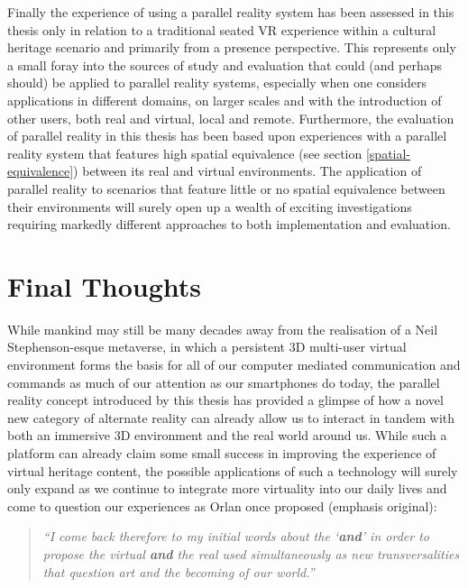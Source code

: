 Finally the experience of using a parallel reality system has been assessed in this thesis only in relation to a traditional seated VR experience within a cultural heritage scenario and primarily from a presence perspective. This represents only a small foray into the sources of study and evaluation that could (and perhaps should) be applied to parallel reality systems, especially when one considers applications in different domains, on larger scales and with the introduction of other users, both real and virtual, local and remote. Furthermore, the evaluation of parallel reality in this thesis has been based upon experiences with a parallel reality system that features high spatial equivalence (see section \ref{spatial-equivalence}) between its real and virtual environments. The application of parallel reality to scenarios that feature little or no spatial equivalence between their environments will surely open up a wealth of exciting investigations requiring markedly different approaches to both implementation and evaluation.


\section{Final Thoughts}

While mankind may still be many decades away from the realisation of a Neil Stephenson-esque metaverse, in which a persistent 3D multi-user virtual environment forms the basis for all of our computer mediated communication and commands as much of our attention as our smartphones do today, the parallel reality concept introduced by this thesis has provided a glimpse of how a novel new category of alternate reality can already allow us to interact in tandem with both an immersive 3D environment and the real world around us. While such a platform can already claim some small success in improving the experience of virtual heritage content, the possible applications of such a technology will surely only expand as we continue to integrate more virtuality into our daily lives and come to question our experiences as Orlan once proposed (emphasis original):

\begin{quote}
	\textit{``I come back therefore to my initial words about the `\textbf{and}' in order to propose the virtual \textbf{and} the real used simultaneously as new transversalities that question art and the becoming of our world.''}~\cite{Orlan2002}
\end{quote}

